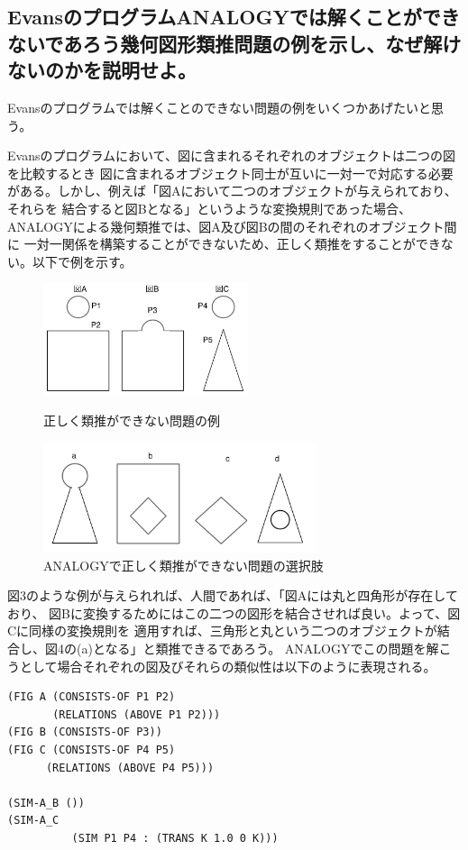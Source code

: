 \documentclass[uplatex]{jsarticle}
\begin{document}
\subsection{EvansのプログラムANALOGYでは解くことができないであろう幾何図形類推問題の例を示し、なぜ解けないのかを説明せよ。}
Evansのプログラムでは解くことのできない問題の例をいくつかあげたいと思う。

Evansのプログラムにおいて、図に含まれるそれぞれのオブジェクトは二つの図を比較するとき
図に含まれるオブジェクト同士が互いに一対一で対応する必要がある。しかし、例えば「図Aにおいて二つのオブジェクトが与えられており、それらを
結合すると図Bとなる」というような変換規則であった場合、ANALOGYによる幾何類推では、図A及び図Bの間のそれぞれのオブジェクト間に
一対一関係を構築することができないため、正しく類推をすることができない。以下で例を示す。

\begin{figure}[htbp]
\begin{minipage}{0.4\hsize}
 \begin{center}
  \includegraphics[width=60mm]{img/example1.png}
 \end{center}
 \caption{正しく類推ができない問題の例}
 \label{fig:one}
\end{minipage}
\begin{minipage}{0.6\hsize}
 \begin{center}
  \includegraphics[width=80mm]{img/sol.png}
 \end{center}
 \caption{ANALOGYで正しく類推ができない問題の選択肢}
 \label{fig:two}
\end{minipage}
\end{figure}

図3のような例が与えられれば、人間であれば、「図Aには丸と四角形が存在しており、
図Bに変換するためにはこの二つの図形を結合させれば良い。よって、図Cに同様の変換規則を
適用すれば、三角形と丸という二つのオブジェクトが結合し、図4の(a)となる」と類推できるであろう。
ANALOGYでこの問題を解こうとして場合それぞれの図及びそれらの類似性は以下のように表現される。
\begin{lstlisting}[basicstyle=\ttfamily\footnotesize, frame=single]
(FIG A (CONSISTS-OF P1 P2)
       (RELATIONS (ABOVE P1 P2)))
(FIG B (CONSISTS-OF P3))
(FIG C (CONSISTS-OF P4 P5)
      (RELATIONS (ABOVE P4 P5)))

(SIM-A_B ())
(SIM-A_C
          (SIM P1 P4 : (TRANS K 1.0 0 K)))
\end{lstlisting}
\end{document}
